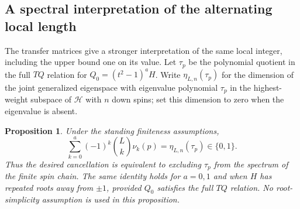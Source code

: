 \documentclass[11pt]{article}
\newtheorem{proposition}{Proposition}[section]
\theoremstyle{definition}
\begin{document}
\subsection{A spectral interpretation of the alternating local length}
\label{sec:balanced-spectral-interpretation}

The transfer matrices give a stronger interpretation of the same local
integer, including the upper bound one on its value.
Let $\tau_p$ be the polynomial quotient in the full $TQ$ relation
for $Q_0=(t^2-1)^aH$. Write $\eta_{L,n}(\tau_p)$ for the dimension
of the joint generalized eigenspace with eigenvalue polynomial
$\tau_p$ in the highest-weight subspace of $\mathcal H$ with $n$
down spins; set this dimension to zero when the eigenvalue is absent.

\begin{proposition}\label{prop:balanced-spectral-euler}
Under the standing finiteness assumptions,
\begin{equation}\label{eq:balanced-spectral-euler}
 \sum_{k=0}^a(-1)^k\binom Lk\nu_k(p)
 =\eta_{L,n}(\tau_p)\in\{0,1\}.
\end{equation}
Thus the desired cancellation is equivalent to excluding $\tau_p$
from the spectrum of the finite spin chain.
The same identity holds for $a=0,1$ and when $H$ has repeated roots
away from $\pm1$, provided $Q_0$ satisfies the full $TQ$ relation.
No root-simplicity assumption is used in this proposition.
\end{proposition}
\end{document}
